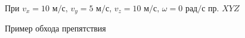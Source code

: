 \documentclass[a5paper, 10pt]{article}
\theoremstyle{definition}
\theoremstyle{plain}
\theoremstyle{remark}
\begin{document}
\begin{figure}[h]
	           \caption{При $v_x = 10 \text{ м/с}, \, v_y = 5  \text{ м/с}, \, v_z = 10  \text{ м/с}, \, \omega = 0 \text{ рад/с}$ пр. $XYZ$}
\end{figure}

\begin{figure}[h]
	           \caption{Пример обхода препятствия}
\end{figure}
\end{document}
